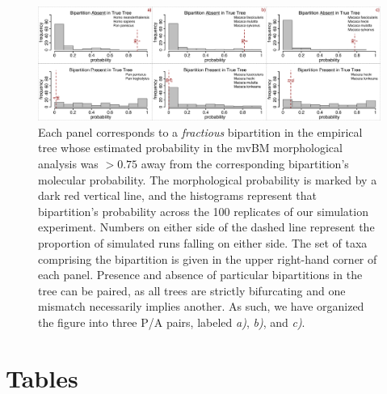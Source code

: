 \documentclass[10pt, twocolumn, twoside]{article}
\begin{document}
\begin{figure}[h]
\centering
\includegraphics[width=160mm]{figures/harvati_figure6_final_redo.pdf}
\caption[Querying the Simulation Experiment for Concordance in Phylogenetic Error]{Each panel corresponds to a \textit{fractious} bipartition in the empirical tree whose estimated probability in the mvBM morphological analysis was $>0.75$ away from the corresponding bipartition's molecular probability. The morphological probability is marked by a dark red vertical line, and the histograms represent that bipartition's probability across the 100 replicates of our simulation experiment. Numbers on either side of the dashed line represent the proportion of simulated runs falling on either side. The set of taxa comprising the bipartition is given in the upper right-hand corner of each panel. Presence and absence of particular bipartitions in the tree can be paired, as all trees are strictly bifurcating and one mismatch necessarily implies another. As such, we have organized the figure into three P/A pairs, labeled \textit{a)}, \textit{b)}, and \textit{c)}. \label{overflow}
\label{fig:harvatiFigure6}}
\end{figure}



\clearpage

\section{Tables}



\clearpage
\twocolumn

{
\footnotesize

}
\end{document}
